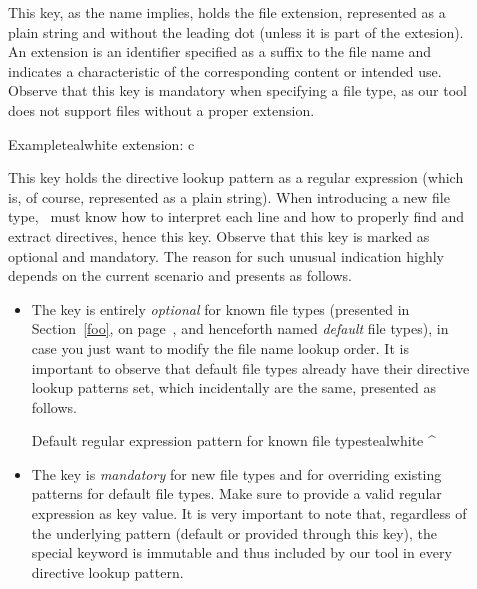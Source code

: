 \begin{description}
\begin{description}
\item[] This key, as the name implies, holds the file extension, represented as a plain string and without the leading dot (unless it is part of the extesion). An extension is an identifier specified as a suffix to the file name and indicates a characteristic of the corresponding content or intended use. Observe that this key is mandatory when specifying a file type, as our tool does not support files without a proper extension.

\begin{codebox}{Example}{teal}{\icnote}{white}
extension: c
\end{codebox}

\item[] This key holds the directive lookup pattern as a regular expression (which is, of course, represented as a plain string). When introducing a new file type, \arara\ must know how to interpret each line and how to properly find and extract directives, hence this key. Observe that this key is marked as optional and mandatory. The reason for such unusual indication highly depends on the current scenario and presents as follows.

\begin{itemize}[label={--}]
\item The  key is entirely \emph{optional} for known file types (presented in Section~\ref{foo}, on page~\pageref{foo}, and henceforth named \emph{default} file types), in case you just want to modify the file name lookup order. It is important to observe that default file types already have their directive lookup patterns set, which incidentally are the same, presented as follows.

\begin{codebox}{Default regular expression pattern for known file types}{teal}{\icnote}{white}
^\s*%
\end{codebox}

\item The  key is \emph{mandatory} for new file types and for overriding existing patterns for default file types. Make sure to provide a valid regular expression as key value. It is very important to note that, regardless of the underlying pattern (default or provided through this key), the special  keyword is immutable and thus included by our tool in every directive lookup pattern.


\end{itemize}
\end{description}
\end{description}

